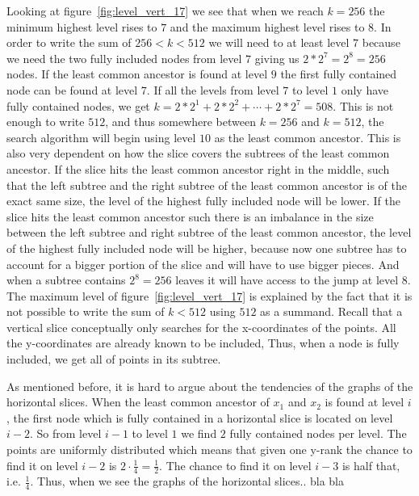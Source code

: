 Looking at figure~\ref{fig:level_vert_17} we see that when we reach $k=256$ the minimum highest level rises to $7$ and the maximum highest level rises to $8$. In order to write the sum of $256<k<512$ we will need to at least level $7$ because we need the two fully included nodes from level $7$ giving us $2*2^7 = 2^8 = 256$ nodes. If the least common ancestor is found at level $9$ the first fully contained node can be found at level $7$. If all the levels from level $7$ to level $1$ only have fully contained nodes, we get $k = 2*2^1 + 2*2^2 + \cdots + 2*2^7 = 508$. This is not enough to write $512$, and thus somewhere between $k=256$ and $k=512$, the search algorithm will begin using level $10$ as the least common ancestor. This is also very dependent on how the slice covers the subtrees of the least common ancestor. If the slice hits the least common ancestor right in the middle, such that the left subtree and the right subtree of the least common ancestor is of the exact same size, the level of the highest fully included node will be lower. If the slice hits the least common ancestor such there is an imbalance in the size between the left subtree and right subtree of the least common ancestor, the level of the highest fully included node will be higher, because now one subtree has to account for a bigger portion of the slice and will have to use bigger pieces. And when a subtree contains $2^8 = 256$ leaves it will have access to the jump at level $8$. The maximum level of figure~\ref{fig:level_vert_17} is explained by the fact that it is not possible to write the sum of $k<512$ using $512$ as a summand. Recall that a vertical slice conceptually only searches for the x-coordinates of the points. All the y-coordinates are already known to be included, Thus, when a node is fully included, we get all of points in its subtree.   

As mentioned before, it is hard to argue about the tendencies of the graphs of the horizontal slices. When the least common ancestor of $x_1$ and $x_2$ is found at level $i$, the first node which is fully contained in a horizontal slice is located on level $i-2$. So from level $i-1$ to level $1$ we find $2$ fully contained nodes per level. The points are uniformly distributed which means that given one y-rank the chance to find it on level $i-2$ is $2\cdot\frac{1}{4} = \frac{1}{2}$. The chance to find it on level $i-3$ is half that, i.e. $\frac{1}{4}$. Thus, when we see the graphs of the horizontal slices.. bla bla


